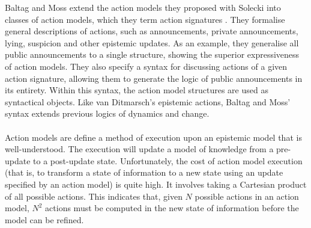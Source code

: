 Baltag and Moss extend the action models they proposed with Solecki into classes
of action models, which they term action signatures \cite{baltag2005programs}.
They formalise general descriptions of actions, such as announcements, private
announcements, lying, suspicion and other epistemic updates.
As an example, they generalise all public announcements to a single structure,
showing the superior expressiveness of action models.
They also specify a syntax for discussing actions of a given action signature,
allowing them to generate the logic of public announcements in its entirety.
Within this syntax, the action model structures are used as syntactical objects.
Like van Ditmarsch's epistemic actions, Baltag and Moss' syntax extends previous
logics of dynamics and change.\\
\\
Action models are define a method of execution upon an epistemic model that is well-understood.
The execution will update a model of knowledge from a pre-update to a
post-update state.
Unfortunately, the cost of action model execution (that is, to transform a state
of information to a new state using an update specified by an action model) is
quite high.
It involves taking a Cartesian product of all possible actions.
This indicates that, given $N$ possible actions in an action model, $N^2$
actions must be computed in the new state of information before the model can
be refined.

